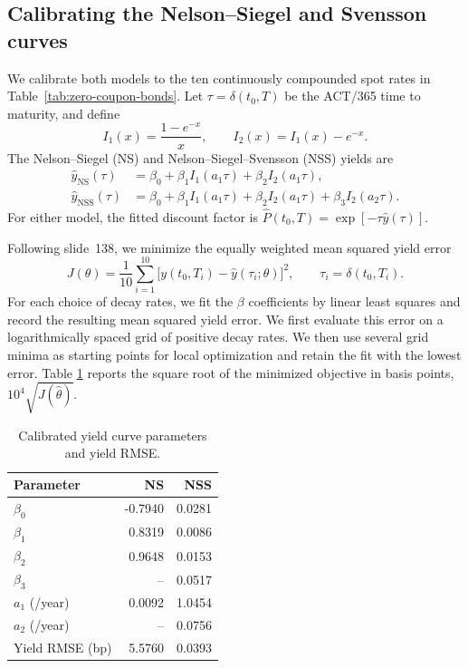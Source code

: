 \documentclass[11pt,a4paper]{article}
\begin{document}
\subsection{Calibrating the Nelson--Siegel and Svensson curves}
\label{subsec:2a}

We calibrate both models to the ten continuously compounded spot
rates in Table~\ref{tab:zero-coupon-bonds}. Let
\(\tau=\delta(t_0,T)\) be the ACT/365 time to maturity, and define
\[
I_1(x)=\frac{1-e^{-x}}{x},\qquad I_2(x)=I_1(x)-e^{-x}.
\]
The Nelson--Siegel (NS) and Nelson--Siegel--Svensson (NSS) yields are
\begin{align*}
\widehat y_{\mathrm{NS}}(\tau)
  &= \beta_0+\beta_1 I_1(a_1\tau)+\beta_2 I_2(a_1\tau),\\
\widehat y_{\mathrm{NSS}}(\tau)
  &= \beta_0+\beta_1 I_1(a_1\tau)+\beta_2 I_2(a_1\tau)
     +\beta_3 I_2(a_2\tau).
\end{align*}
For either model, the fitted discount factor is
\(\widehat P(t_0,T)=\exp[-\tau\widehat y(\tau)]\).

Following slide~138, we minimize the equally weighted mean squared
yield error
\[
J(\theta)
  = \frac{1}{10}\sum_{i=1}^{10}
    \bigl[y(t_0,T_i)-\widehat y(\tau_i;\theta)\bigr]^2,
\qquad \tau_i=\delta(t_0,T_i).
\]
For each choice of decay rates, we fit the \(\beta\) coefficients
by linear least squares and record the resulting mean squared
yield error. We first evaluate this error on a logarithmically
spaced grid of positive decay rates. We then use several grid
minima as starting points for local optimization and retain the
fit with the lowest error.
Table \ref{tab:ns-nss-calibration} reports the square root of the minimized objective in
basis points, $10^4\sqrt{J(\hat\theta)}$.

\begin{table}[htbp]
  \centering
  \caption{Calibrated yield curve parameters and yield RMSE.}
  \label{tab:ns-nss-calibration}
  \begin{tabular}{lrr}
    \toprule
    Parameter & NS & NSS \\
    \midrule
    \(\beta_0\)            & -0.7940 & 0.0281 \\
    \(\beta_1\)            &  0.8319 & 0.0086 \\
    \(\beta_2\)            &  0.9648 & 0.0153 \\
    \(\beta_3\)            &      -- & 0.0517 \\
    \(a_1\) (/year) &  0.0092 & 1.0454 \\
    \(a_2\) (/year) &      -- & 0.0756 \\
    Yield RMSE (bp)        &  5.5760 & 0.0393 \\
    \bottomrule
  \end{tabular}
\end{table}
\end{document}
